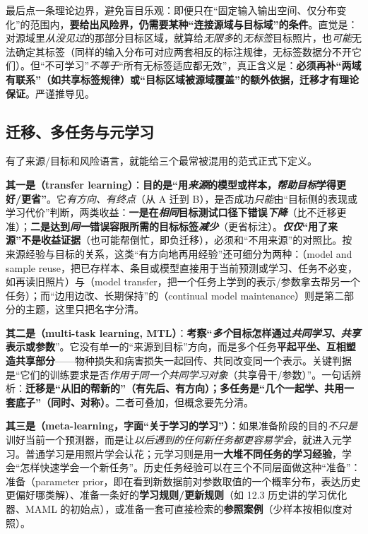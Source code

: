 最后点一条理论边界，避免盲目乐观：即便只在“固定输入输出空间、仅分布变化”的范围内，\textbf{要给出风险界，仍需要某种“连接源域与目标域”的条件}。直觉是：对源域里\emph{从没见过}的那部分目标区域，就算给\emph{无限多}的\emph{无标签}目标照片，也\emph{可能}无法确定其标签（同样的输入分布可对应两套相反的标注规律，无标签数据分不开它们）。但“不可学习”\emph{不等于}“所有无标签适应都无效”，真正含义是：\textbf{必须再补“两域有联系”（如共享标签规律）或“目标区域被源域覆盖”的额外依据，迁移才有理论保证}。严谨推导见。

\subsection{迁移、多任务与元学习}
\label{sec:kts-overview-paradigms}

有了来源/目标和风险语言，就能给三个最常被混用的范式正式下定义。

\textbf{其一是（transfer learning）}：\textbf{目的是“用\emph{来源}的模型或样本，\emph{帮助\emph{目标}}学得更好/更省”}。它\emph{有方向、有终点}（从 A 迁到 B），是否成功\emph{只能}由“目标侧的表现或学习代价”判断，两类收益：\textbf{一是在\emph{相同}目标测试口径下错误\emph{下降}}（比不迁移更准）；\textbf{二是达到\emph{同一}错误容限所需的目标标签\emph{减少}}（更省标注）。\textbf{\emph{仅仅}“用了来源”不是收益证据}（也可能帮倒忙，即负迁移），必须和“不用来源”的对照比。按来源经验与目标的关系，这类“有方向地再用经验”还可细分为两种：（model and sample reuse，把已存样本、条目或模型直接用于当前预测或学习、任务不必变，如再读旧照片）与（model transfer，把一个任务上学到的表示/参数拿去帮另一个任务）；而“边用边改、长期保持”的（continual model maintenance）则是第二部分的主题，这里只把名字分清。

\textbf{其二是（multi-task learning, MTL）}：\textbf{考察“\emph{多个}目标怎样通过\emph{共同学习、共享}表示或参数}”。它没有单一的“来源到目标”方向，而是多个任务\textbf{平起平坐、互相塑造共享部分}——物种损失和病害损失一起回传、共同改变同一个表示。关键判据是“它们的训练要求是否\emph{作用于同一个共同学习对象}（共享骨干/参数）”。一句话辨析：\textbf{迁移是“从旧的帮新的”（有先后、有方向）；多任务是“几个一起学、共用一套底子”（同时、对称）}。二者可叠加，但概念要先分清。

\textbf{其三是（meta-learning，字面“关于学习的学习”）}：如果准备阶段的目的\emph{不只是}训好当前一个预测器，而是让\emph{以后遇到的任何新任务都更容易学会}，就进入元学习。普通学习是用照片学会认花；元学习则是用\textbf{一大堆不同任务的学习经验}，学会“怎样快速学会一个新任务”。历史任务经验可以在三个不同层面做这种“准备”：准备（parameter prior，即在看到新数据前对参数取值的一个概率分布，表达历史更偏好哪类解）、准备一条好的\textbf{学习规则/更新规则}（如 12.3 历史讲的学习优化器、MAML 的初始点），或准备一套可直接检索的\textbf{参照案例}（少样本按相似度对照）。

